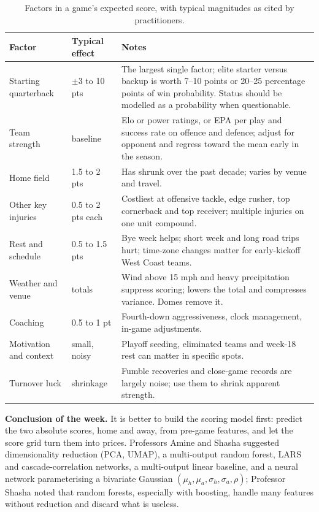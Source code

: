 \documentclass[11pt]{article}
\begin{document}
\begin{table}[H]
\centering
\small
\begin{tabular}{p{3cm}p{2.4cm}p{8.4cm}}
\toprule
\textbf{Factor} & \textbf{Typical effect} & \textbf{Notes} \\
\midrule
Starting quarterback & $\pm$3 to 10 pts & The largest single factor; elite starter versus backup is worth 7--10 points or 20--25 percentage points of win probability. Status should be modelled as a probability when questionable. \\
Team strength & baseline & Elo or power ratings, or EPA per play and success rate on offence and defence; adjust for opponent and regress toward the mean early in the season. \\
Home field & 1.5 to 2 pts & Has shrunk over the past decade; varies by venue and travel. \\
Other key injuries & 0.5 to 2 pts each & Costliest at offensive tackle, edge rusher, top cornerback and top receiver; multiple injuries on one unit compound. \\
Rest and schedule & 0.5 to 1.5 pts & Bye week helps; short week and long road trips hurt; time-zone changes matter for early-kickoff West Coast teams. \\
Weather and venue & totals & Wind above 15 mph and heavy precipitation suppress scoring; lowers the total and compresses variance. Domes remove it. \\
Coaching & 0.5 to 1 pt & Fourth-down aggressiveness, clock management, in-game adjustments. \\
Motivation and context & small, noisy & Playoff seeding, eliminated teams and week-18 rest can matter in specific spots. \\
Turnover luck & shrinkage & Fumble recoveries and close-game records are largely noise; use them to shrink apparent strength. \\
\bottomrule
\end{tabular}
\caption{Factors in a game's expected score, with typical magnitudes as cited by practitioners.}
\label{tab:factors}
\end{table}

\textbf{Conclusion of the week.} It is better to build the scoring model first: predict the two absolute scores, home and away, from pre-game features, and let the score grid turn them into prices. Professors Amine and Shasha suggested dimensionality reduction (PCA, UMAP), a multi-output random forest, LARS and cascade-correlation networks, a multi-output linear baseline, and a neural network parameterising a bivariate Gaussian $(\mu_h,\mu_a,\sigma_h,\sigma_a,\rho)$; Professor Shasha noted that random forests, especially with boosting, handle many features without reduction and discard what is useless.
\end{document}
